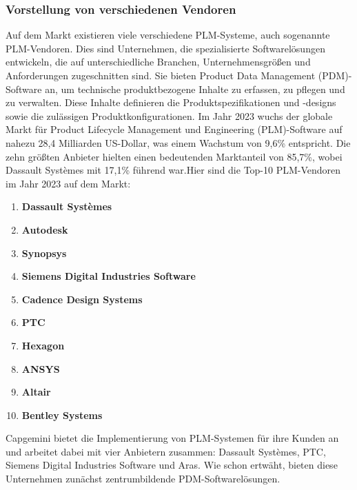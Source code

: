 \documentclass[a4paper, 12pt]{scrartcl}
\begin{document}
	\subsubsection{Vorstellung von verschiedenen Vendoren}
	Auf dem Markt existieren viele verschiedene PLM-Systeme, auch sogenannte PLM-Vendoren. Dies sind Unternehmen, die spezialisierte Softwarelösungen entwickeln, die auf unterschiedliche Branchen, Unternehmensgrößen und Anforderungen zugeschnitten sind. Sie bieten Product Data Management (PDM)-Software an, um technische produktbezogene Inhalte zu erfassen, zu pflegen und zu verwalten. Diese Inhalte definieren die Produktspezifikationen und -designs sowie die zulässigen Produktkonfigurationen\cite{PLM1}.
	Im Jahr 2023 wuchs der globale Markt für Product Lifecycle Management und Engineering (PLM)-Software auf nahezu 28,4 Milliarden US-Dollar, was einem Wachstum von 9,6\% entspricht. Die zehn größten Anbieter hielten einen bedeutenden Marktanteil von 85,7\%, wobei Dassault Systèmes mit 17,1\% führend war.Hier sind die Top-10 PLM-Vendoren im Jahr 2023 auf dem Markt\cite{Top10PLMVendoren}:
	\begin{enumerate}
		\item \textbf{Dassault Systèmes} 
		\item \textbf{Autodesk}
		\item \textbf{Synopsys}
		\item \textbf{Siemens Digital Industries Software}
		\item \textbf{Cadence Design Systems}
		\item \textbf{PTC}
		\item \textbf{Hexagon}
		\item \textbf{ANSYS}
		\item \textbf{Altair}
		\item \textbf{Bentley Systems}
	\end{enumerate}
	Capgemini bietet die Implementierung von PLM-Systemen für ihre Kunden an und arbeitet dabei mit vier Anbietern zusammen: Dassault Systèmes, PTC, Siemens Digital Industries Software und Aras. Wie schon ertwäht, bieten diese Unternehmen zunächst zentrumbildende PDM-Softwarelösungen.
\end{document}
